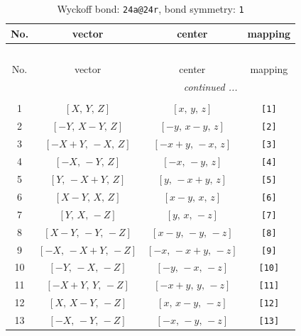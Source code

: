 \documentclass[fleqn,8pt]{jsarticle}
\begin{document}
\begin{longtable}{cccc}
\caption{Wyckoff bond: {\tt 24a@24r}, bond symmetry: {\tt 1}}
 \\
 \hline \hline
No. & vector & center & mapping \\ \hline \endfirsthead

\multicolumn{3}{l}{\tablename\ \thetable{}} \\
 \hline \hline
No. & vector & center & mapping \\ \hline \endhead

 \hline \hline
\multicolumn{3}{r}{\footnotesize\it continued ...} \\ \endfoot

 \hline \hline
\multicolumn{3}{r}{} \\ \endlastfoot

1 & $\left[ X,\, Y,\, Z \right]$ & $\left[ x,\, y,\, z \right]$ & {\tt [1]} \\ \hline
2 & $\left[ - Y,\, X - Y,\, Z \right]$ & $\left[ - y,\, x - y,\, z \right]$ & {\tt [2]} \\ \hline
3 & $\left[ - X + Y,\, - X,\, Z \right]$ & $\left[ - x + y,\, - x,\, z \right]$ & {\tt [3]} \\ \hline
4 & $\left[ - X,\, - Y,\, Z \right]$ & $\left[ - x,\, - y,\, z \right]$ & {\tt [4]} \\ \hline
5 & $\left[ Y,\, - X + Y,\, Z \right]$ & $\left[ y,\, - x + y,\, z \right]$ & {\tt [5]} \\ \hline
6 & $\left[ X - Y,\, X,\, Z \right]$ & $\left[ x - y,\, x,\, z \right]$ & {\tt [6]} \\ \hline
7 & $\left[ Y,\, X,\, - Z \right]$ & $\left[ y,\, x,\, - z \right]$ & {\tt [7]} \\ \hline
8 & $\left[ X - Y,\, - Y,\, - Z \right]$ & $\left[ x - y,\, - y,\, - z \right]$ & {\tt [8]} \\ \hline
9 & $\left[ - X,\, - X + Y,\, - Z \right]$ & $\left[ - x,\, - x + y,\, - z \right]$ & {\tt [9]} \\ \hline
10 & $\left[ - Y,\, - X,\, - Z \right]$ & $\left[ - y,\, - x,\, - z \right]$ & {\tt [10]} \\ \hline
11 & $\left[ - X + Y,\, Y,\, - Z \right]$ & $\left[ - x + y,\, y,\, - z \right]$ & {\tt [11]} \\ \hline
12 & $\left[ X,\, X - Y,\, - Z \right]$ & $\left[ x,\, x - y,\, - z \right]$ & {\tt [12]} \\ \hline
13 & $\left[ - X,\, - Y,\, - Z \right]$ & $\left[ - x,\, - y,\, - z \right]$ & {\tt [13]} \\ \hline

\end{longtable}
\end{document}
